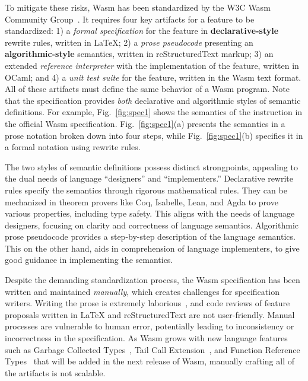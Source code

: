 To mitigate these risks, Wasm has been standardized by
the W3C Wasm Community Group~\cite{wasm-w3c}.
It requires four key artifacts for a feature to be standardized:
1) a \textit{formal specification} for the feature in \textbf{declarative-style} rewrite rules, written in LaTeX;
2) a \textit{prose pseudocode} presenting an \textbf{algorithmic-style} semantics, written in reStructuredText markup;
3) an extended \textit{reference interpreter} with the implementation of the feature, written in OCaml; and
4) a \textit{unit test suite} for the feature, written in the Wasm text format.
All of these artifacts must define the same behavior of a Wasm program.
Note that the specification provides \textit{both} declarative and algorithmic styles of semantic definitions.
For example, Fig.~\ref{fig:spec1} shows the semantics of the
 instruction in the official Wasm specification.
Fig.~\ref{fig:spec1}(a) presents the semantics in a prose notation broken down into four steps,
while Fig.~\ref{fig:spec1}(b) specifies it in a formal notation using rewrite rules.

The two styles of semantic definitions possess distinct strongpoints,
appealing to the dual needs of language ``designers'' and ``implementers.''
Declarative rewrite rules specify the semantics through rigorous mathematical rules.
They can be mechanized in theorem provers like Coq, Isabelle, Lean, and Agda
to prove various properties, including type safety.
This aligns with the needs of language designers,
focusing on clarity and correctness of language semantics.
Algorithmic prose pseudocode provides a step-by-step description of the language semantics.
This on the other hand, aids in comprehension of language implementers,
to give good guidance in implementing the semantics.

Despite the demanding standardization process, the Wasm specification has been
written and maintained \textit{manually}, which creates challenges for specification writers.
Writing the prose is extremely laborious~\cite{Andreasicfp23}, and code reviews of
feature proposals written in LaTeX and reStructuredText are not user-friendly.
Manual processes are vulnerable to human error, potentially leading
to inconsistency or incorrectness in the specification.
As Wasm grows with new language features such as Garbage Collected Types~\cite{wasm-gc},
Tail Call Extension~\cite{wasm-tce}, and Function Reference Types~\cite{wasm-frt}
that will be added in the next release of Wasm, manually crafting all of the artifacts is not scalable.


